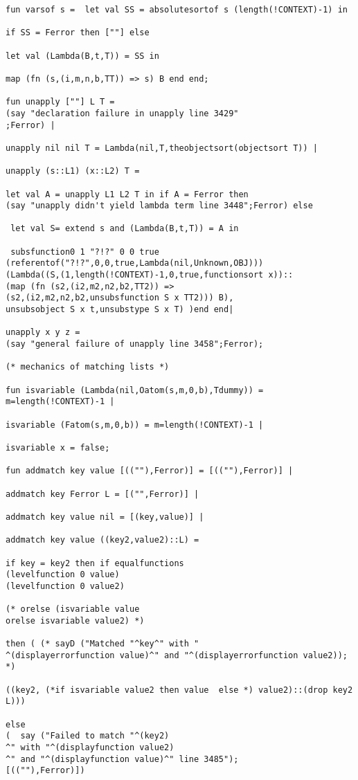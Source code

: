 \documentclass[12pt]{article}
\begin{document}
\begin{verbatim}
fun varsof s =  let val SS = absolutesortof s (length(!CONTEXT)-1) in 

if SS = Ferror then [""] else

let val (Lambda(B,t,T)) = SS in

map (fn (s,(i,m,n,b,TT)) => s) B end end;

fun unapply [""] L T = 
(say "declaration failure in unapply line 3429"
;Ferror) |

unapply nil nil T = Lambda(nil,T,theobjectsort(objectsort T)) |

unapply (s::L1) (x::L2) T = 

let val A = unapply L1 L2 T in if A = Ferror then 
(say "unapply didn't yield lambda term line 3448";Ferror) else 

 let val S= extend s and (Lambda(B,t,T)) = A in

 subsfunction0 1 "?!?" 0 0 true 
(referentof("?!?",0,0,true,Lambda(nil,Unknown,OBJ))) 
(Lambda((S,(1,length(!CONTEXT)-1,0,true,functionsort x))::
(map (fn (s2,(i2,m2,n2,b2,TT2)) => 
(s2,(i2,m2,n2,b2,unsubsfunction S x TT2))) B),
unsubsobject S x t,unsubstype S x T) )end end|

unapply x y z = 
(say "general failure of unapply line 3458";Ferror);

(* mechanics of matching lists *)

fun isvariable (Lambda(nil,Oatom(s,m,0,b),Tdummy)) = m=length(!CONTEXT)-1 |

isvariable (Fatom(s,m,0,b)) = m=length(!CONTEXT)-1 |

isvariable x = false;

fun addmatch key value [((""),Ferror)] = [((""),Ferror)] |

addmatch key Ferror L = [("",Ferror)] |

addmatch key value nil = [(key,value)] |

addmatch key value ((key2,value2)::L) =

if key = key2 then if equalfunctions 
(levelfunction 0 value) 
(levelfunction 0 value2) 

(* orelse (isvariable value
orelse isvariable value2) *)

then ( (* sayD ("Matched "^key^" with "
^(displayerrorfunction value)^" and "^(displayerrorfunction value2)); *)

((key2, (*if isvariable value2 then value  else *) value2)::(drop key2 L)))

else  
(  say ("Failed to match "^(key2)
^" with "^(displayfunction value2)
^" and "^(displayfunction value)^" line 3485"); 
[((""),Ferror)])


\end{verbatim}
\end{document}
